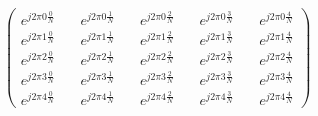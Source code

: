 $ \begin{pmatrix} e^{j2\pi 0\frac{0}{N}} \quad & e^{j2\pi 0\frac{1}{N}} \quad & e^{j2\pi 0\frac{2}{N}} \quad & e^{j2\pi 0\frac{3}{N}} \quad & e^{j2\pi 0\frac{4}{N}}  \\[6pt] e^{j2\pi 1\frac{0}{N}} \quad & e^{j2\pi 1\frac{1}{N}} \quad & e^{j2\pi 1\frac{2}{N}} \quad & e^{j2\pi 1\frac{3}{N}} \quad & e^{j2\pi 1\frac{4}{N}}  \\[6pt] e^{j2\pi 2\frac{0}{N}} \quad & e^{j2\pi 2\frac{1}{N}} \quad & e^{j2\pi 2\frac{2}{N}} \quad & e^{j2\pi 2\frac{3}{N}} \quad & e^{j2\pi 2\frac{4}{N}}  \\[6pt] e^{j2\pi 3\frac{0}{N}} \quad & e^{j2\pi 3\frac{1}{N}} \quad & e^{j2\pi 3\frac{2}{N}} \quad & e^{j2\pi 3\frac{3}{N}} \quad & e^{j2\pi 3\frac{4}{N}} \\[6pt] e^{j2\pi 4\frac{0}{N}} \quad & e^{j2\pi 4\frac{1}{N}} \quad & e^{j2\pi 4\frac{2}{N}} \quad & e^{j2\pi 4\frac{3}{N}} \quad & e^{j2\pi 4\frac{4}{N}} \end{pmatrix}$
